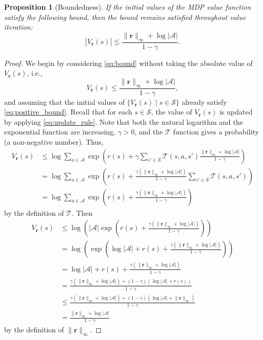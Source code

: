 \documentclass{mpaper}
\newtheorem{proposition}[theorem]{Proposition}
\newcommand{\V}{V_{\mathbf{r}}}
\newcommand{\vbound}{\frac{\rinf + \log|\mathcal{A}|}{1 - \gamma}}
\newcommand{\rinf}{\lVert \mathbf{r} \rVert_\infty}
\begin{document}
\begin{proposition}[Boundedness] \label{thm:bound}
  If the initial values of the MDP value function satisfy the following
  bound, then the bound remains satisfied throughout value iteration:
  \begin{equation} \label{eq:bound}
    |\V(s)| \le \vbound.
  \end{equation}
\end{proposition}
\begin{proof}
  We begin by considering \eqref{eq:bound} without taking the absolute value of
  $\V(s)$, i.e.,
  \begin{equation} \label{eq:positive_bound}
    \V(s) \le \vbound,
  \end{equation}
  and assuming that the initial values of $\{ \V(s) \mid s \in \mathcal{S} \}$
  already satisfy \eqref{eq:positive_bound}. Recall that for each $s \in
  \mathcal{S}$, the value of $\V(s)$ is updated by applying
  \eqref{eq:update_rule}. Note that both the natural logarithm and the
  exponential function are increasing, $\gamma > 0$, and the $\mathcal{T}$
  function gives a probability (a non-negative number). Thus,
  \begin{align*}
    \V(s) &\le \log \sum_{a \in \mathcal{A}} \exp\left( r(s) + \gamma\sum_{s' \in \mathcal{S}} \mathcal{T}(s, a, s')\frac{\rinf + \log|\mathcal{A}|}{1 - \gamma} \right) \\
          &= \log \sum_{a \in \mathcal{A}} \exp\left( r(s) + \frac{\gamma (\rinf + \log|\mathcal{A}|)}{1 - \gamma}\sum_{s' \in \mathcal{S}} \mathcal{T}(s, a, s') \right) \\
          &= \log \sum_{a \in \mathcal{A}} \exp\left( r(s) + \frac{\gamma (\rinf + \log|\mathcal{A}|)}{1 - \gamma} \right)
  \end{align*}
  by the definition of $\mathcal{T}$. Then
  \begin{align*}
    \V(s) &\le \log \left( |\mathcal{A}| \exp\left( r(s) + \frac{\gamma (\rinf + \log|\mathcal{A}|)}{1 - \gamma} \right) \right) \\
          &= \log \left( \exp\left( \log|\mathcal{A}| + r(s) + \frac{\gamma (\rinf + \log|\mathcal{A}|)}{1 - \gamma} \right) \right) \\
          &= \log|\mathcal{A}| + r(s) + \frac{\gamma (\rinf + \log|\mathcal{A}|)}{1 - \gamma} \\
          &= \frac{\gamma (\rinf + \log|\mathcal{A}|) + (1 - \gamma)(\log|\mathcal{A}| + r(s))}{1 - \gamma} \\
          &\le \frac{\gamma (\rinf + \log|\mathcal{A}|) + (1 - \gamma)(\log|\mathcal{A}| + \rinf)}{1 - \gamma} \\
          &= \vbound
  \end{align*}
  by the definition of $\rinf$.


\end{proof}
\end{document}
